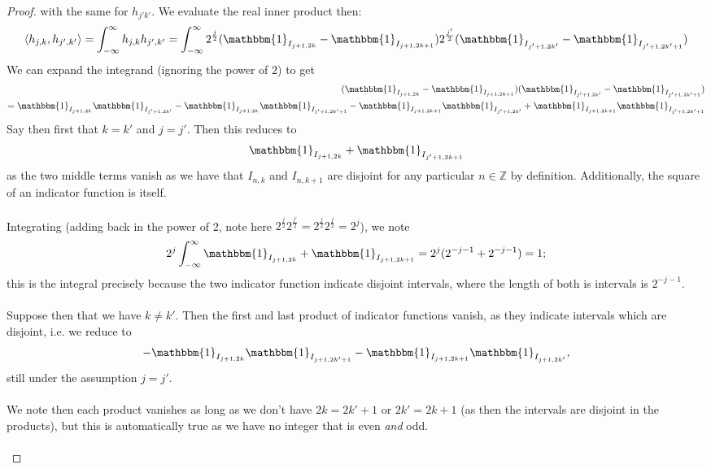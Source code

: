 \documentclass[12pt]{article}
\newenvironment{ex}[2][Exercise]{\begin{trivlist}
\item[\hskip \labelsep {\bfseries #1}\hskip \labelsep {\bfseries #2.}]}{\end{trivlist}}
\begin{document}
\begin{ex}{14}
\begin{enumerate}[label=(\alph*)]
\begin{proof}
            with the same for $h_{j'k'}$. We evaluate the real inner product then:
            $$\langle h_{j,k}, h_{j',k'} \rangle = \int_{-\infty}^\infty h_{j,k}h_{j',k'} = \int_{-\infty}^\infty 2^{\frac{j}{2}} (\mathbbm{1}_{I_{j + 1, 2k}} - \mathbbm{1}_{I_{j + 1, 2k + 1}})2^{\frac{j'}{2}} (\mathbbm{1}_{I_{j' + 1, 2k'}} - \mathbbm{1}_{I_{j' + 1, 2k' + 1}})$$
            We can expand the integrand (ignoring the power of $2$) to get 
            \begin{align*}
                (\mathbbm{1}_{I_{j + 1, 2k}} - \mathbbm{1}_{I_{j + 1, 2k + 1}})(\mathbbm{1}_{I_{j' + 1, 2k'}} - \mathbbm{1}_{I_{j' + 1, 2k' + 1}}) \\ = \mathbbm{1}_{I_{j + 1, 2k}}\mathbbm{1}_{I_{j' + 1, 2k'}} - \mathbbm{1}_{I_{j + 1, 2k}}\mathbbm{1}_{I_{j' + 1, 2k' + 1}} - \mathbbm{1}_{I_{j + 1, 2k + 1}}\mathbbm{1}_{I_{j' + 1, 2k'}} + \mathbbm{1}_{I_{j + 1, 2k + 1}}\mathbbm{1}_{I_{j' + 1, 2k' + 1}}
            \end{align*}
            Say then first that $k = k'$ and $j = j'$. Then this reduces to 
            $$\mathbbm{1}_{I_{j + 1, 2k}} + \mathbbm{1}_{I_{j' + 1, 2k + 1}}$$
            as the two middle terms vanish as we have that $I_{n,k}$ and $I_{n,k + 1}$ are disjoint for any particular $n \in \mathbb{Z}$ by definition. Additionally, the square of an indicator function is itself. \\ \\  
            Integrating (adding back in the power of 2, note here $2^\frac{j}{2}2^\frac{j'}{2} = 2^\frac{j}{2}2^\frac{j}{2} = 2^j$), we note
            $$2^j\int_{-\infty}^\infty \mathbbm{1}_{I_{j + 1, 2k}} + \mathbbm{1}_{I_{j + 1, 2k + 1}} = 2^j(2^{-j - 1} + 2^{-j - 1}) = 1;$$
            this is the integral precisely because the two indicator function indicate disjoint intervals, where the length of both is intervals is $2^{-j - 1}$. \\ \\
            Suppose then that we have $k \neq k'$. Then the first and last product of indicator functions vanish, as they indicate intervals which are disjoint, i.e. we reduce to
            $$- \mathbbm{1}_{I_{j + 1, 2k}}\mathbbm{1}_{I_{j + 1, 2k' + 1}} - \mathbbm{1}_{I_{j + 1, 2k + 1}}\mathbbm{1}_{I_{j + 1, 2k'}},$$
            still under the assumption $j = j'$. \\ \\ We note then each product vanishes as long as we don't have $2k = 2k' + 1$ or $2k' = 2k + 1$ (as then the intervals are disjoint in the products), but this is automatically true as we have no integer that is even \textit{and} odd. \\ \\ 

\end{proof}
\end{enumerate}
\end{ex}
\end{document}
